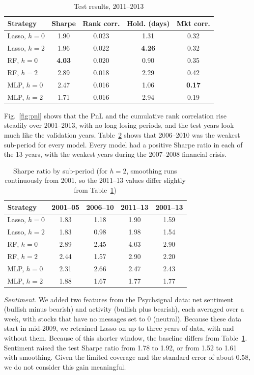 \documentclass[conference]{IEEEtran}
\begin{document}
\begin{table}[t]
\centering
\small
\caption{Test results, 2011--2013}
\label{tab:test}
\begin{tabular}{lcccc}
\toprule
Strategy & Sharpe & Rank corr. & Hold. (days) & Mkt corr.\\
\midrule
Lasso, $h=0$ & 1.90 & 0.023 & 1.31 & 0.32\\
Lasso, $h=2$ & 1.96 & 0.022 & \textbf{4.26} & 0.32\\
RF, $h=0$ & \textbf{4.03} & 0.020 & 0.90 & 0.35\\
RF, $h=2$ & 2.89 & 0.018 & 2.29 & 0.42\\
MLP, $h=0$ & 2.47 & 0.016 & 1.06 & \textbf{0.17}\\
MLP, $h=2$ & 1.71 & 0.016 & 2.94 & 0.19\\
\bottomrule
\end{tabular}
\end{table}

Fig.~\ref{fig:pnl} shows that the PnL and the cumulative rank correlation rise steadily over 2001--2013, with no long losing periods, and the test years look much like the validation years. Table~\ref{tab:sub} shows that 2006--2010 was the weakest sub-period for every model. Every model had a positive Sharpe ratio in each of the 13 years, with the weakest years during the 2007--2008 financial crisis.



\begin{table}[t]
\centering
\small
\caption{Sharpe ratio by sub-period (for $h=2$, smoothing runs continuously from 2001, so the 2011--13 values differ slightly from Table~\ref{tab:test})}
\label{tab:sub}
\begin{tabular}{lcccc}
\toprule
Strategy & 2001--05 & 2006--10 & 2011--13 & 2001--13\\
\midrule
Lasso, $h=0$ & 1.83 & 1.18 & 1.90 & 1.59\\
Lasso, $h=2$ & 1.83 & 0.98 & 1.98 & 1.54\\
RF, $h=0$ & 2.89 & 2.45 & 4.03 & 2.90\\
RF, $h=2$ & 2.44 & 1.57 & 2.90 & 2.20\\
MLP, $h=0$ & 2.31 & 2.66 & 2.47 & 2.43\\
MLP, $h=2$ & 1.88 & 1.67 & 1.77 & 1.77\\
\bottomrule
\end{tabular}
\end{table}

\textit{Sentiment.} We added two features from the Psychsignal data: net sentiment (bullish minus bearish) and activity (bullish plus bearish), each averaged over a week, with stocks that have no messages set to 0 (neutral). Because these data start in mid-2009, we retrained Lasso on up to three years of data, with and without them. Because of this shorter window, the baseline differs from Table~\ref{tab:test}. Sentiment raised the test Sharpe ratio from 1.78 to 1.92, or from 1.52 to 1.61 with smoothing. Given the limited coverage and the standard error of about 0.58, we do not consider this gain meaningful.
\end{document}
